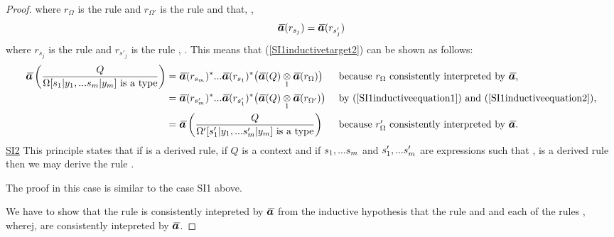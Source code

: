 \begin{proof}
where $r_\Omega$ is the rule \SIonesourcelhs and $r_{\Omega'}$ is the rule \SIonesourcerhs
and that, \foreachj,
\begin{equation}
\label{SI1inductiveequation2}
\Ibar(r_{s_j})=\Ibar(r_{s'_j})
\end{equation}
where  $r_{s_j}$ is the rule 
and $r_{s'_j}$ is the rule , \foreachj.
This means that (\ref{SI1inductivetarget2}) can be shown as follows:
\begin{align*}
\ibarmappedrule{Q}{\isT{\Omega[\SUBsFORy{m}]}} 
    &=\Ibar(r_{s_m})^* ... \Ibar(r_{s_1})^*\big( \crossx{\Ibar(Q)}{\Ibar(r_\Omega)}{1} \big)
    &&\mbox{ because $r_\Omega$ consistently interpreted by $\Ibar$,} \\
    &=\Ibar(r_{s'_m})^* ... \Ibar(r_{s'_1})^*\big( \crossx{\Ibar(Q)}{\Ibar(r_{\Omega'})}{1} \big)
    &&\mbox{ by (\ref{SI1inductiveequation1}) and (\ref{SI1inductiveequation2}),} \\
    &=\ibarmappedrule{Q}{\isT{\Omega'[\SUBspFORy{m}]}}
    &&\mbox{ because $r_\Omega'$ consistently interpreted by $\Ibar$.} 
\end{align*}
\newpage
\underline{SI2} 
\newcommand{\SItwosourcelhs}{\gatdisplayrule{\yOmega{m}}{\ofT{s}{\Omega}}}
\newcommand{\SItwosourcerhs}{\gatdisplayrule{\yOmega{m}}{\ofT{s'}{\Omega'}}}
\newcommand{\SItwoconclusion}{\gatdisplayrule{Q}{s[\SUBsFORy{m}]=s'[\SUBspFORy{m}] \in \Omega[\SUBsFORy{m}]}}
\newcommand{\SItwoconclusionlhs}{\gatdisplayrule{Q}{\ofT{s[\SUBsFORy{m}]}{\Omega[\SUBsFORy{m}]}}}
\newcommand{\SItwoconclusionrhs}{\gatdisplayrule{Q}{\ofT{s'[\SUBspFORy{m}]}{\Omega[\SUBsFORy{m}]}}}
This principle states that if  is a derived rule, 
if $Q$ is a context and if  $s_1,...s_{m}$ and $s'_1,...s'_{m}$ are expressions such that
\foreachj,  is a derived rule then we may derive the rule \SItwoconclusion. 

The proof in this case is similar to the case SI1 above. 

We have to show that the rule \SItwoconclusion is consistently intepreted by $\Ibar$
from the inductive hypothesis  that the rule 
and \foreachj  and each of the rules , wherej,  are consistently intepreted by $\Ibar$.


\end{proof}
